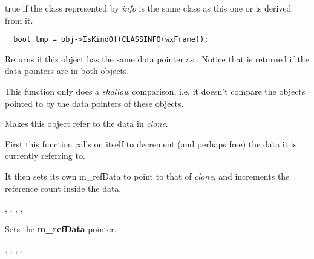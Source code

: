 true if the class represented by {\it info} is the same class as
this one or is derived from it.


\begin{verbatim}
  bool tmp = obj->IsKindOf(CLASSINFO(wxFrame));
\end{verbatim}

\label{wxobjectissameas}


Returns \true if this object has the same data pointer as . Notice
that \true is returned if the data pointers are \NULL in both objects.

This function only does a \emph{shallow} comparison, i.e. it doesn't compare
the objects pointed to by the data pointers of these objects.

\label{wxobjectref}


Makes this object refer to the data in {\it clone}.




First this function calls  on itself
to decrement (and perhaps free) the data it is currently referring to.

It then sets its own m\_refData to point to that of {\it clone}, and increments the reference count
inside the data.


, ,\rtfsp
{}, ,\rtfsp
{}

\label{wxobjectsetrefdata}


Sets the {\bf m\_refData} pointer.


, , ,\rtfsp
{},\rtfsp
{}

